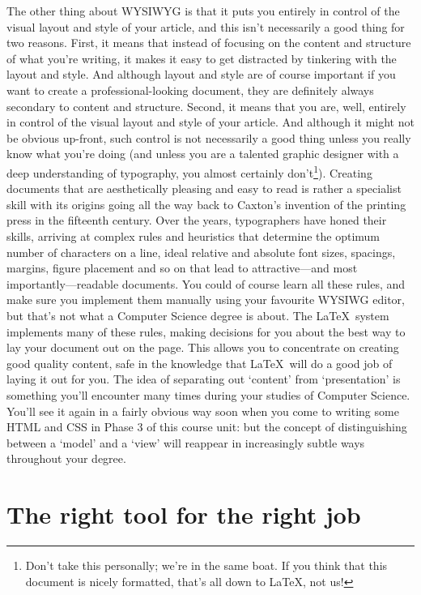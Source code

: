 The other thing about WYSIWYG is that it puts you entirely in control of the visual layout and style of your article, and this isn't necessarily a good thing for two reasons. First, it means that instead of focusing on the content and structure of what you're writing, it makes it easy to get distracted by tinkering with the layout and style. And although layout and style are of course important if you want to create a professional-looking document, they are definitely always secondary to content and structure. Second, it means that you are, well, entirely in control of the visual layout and style of your article. And although it might not be obvious up-front, such control is not necessarily a good thing unless you really know what you're doing (and unless you are a talented graphic designer with a deep understanding of typography, you almost certainly don't\footnote{Don't take this personally; we're in the same boat. If you think that this document is nicely formatted, that's all down to \LaTeX, not us!}). Creating documents that are aesthetically pleasing and easy to read is rather a specialist skill with its origins going all the way back to Caxton's invention of the printing press in the fifteenth century.  Over the years, typographers have honed their skills, arriving at complex rules and heuristics that determine the optimum number of characters on a line, ideal relative and absolute font sizes, spacings, margins, figure placement and so on that lead to attractive---and most importantly---readable documents. You could of course learn all these rules, and make sure you implement them manually using your favourite WYSIWG editor, but that's not what a Computer Science degree is about. The \LaTeX\ system implements many of these rules, making decisions for you about the best way to lay your document out on the page. This allows you to concentrate on creating good quality content, safe in the knowledge that \LaTeX\ will do a good job of laying it out for you. The idea of separating out `content' from `presentation' is something you'll encounter many times during your studies of Computer Science. You'll see it again in a fairly obvious way soon when you come to writing some HTML and CSS in Phase 3 of this course unit: but the concept of distinguishing between a `model' and a `view' will reappear in increasingly subtle ways throughout your degree. 

\section{The right tool for the right job}

